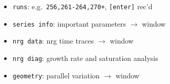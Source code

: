 \documentclass[9pt]{beamer}
\begin{document}
{\begin{frame}[fragile]
\begin{block}{}
\begin{itemize}
\item \verb|runs|: e.g.~\verb|256,261-264,270+|, \verb|[enter]| rec'd
\item \verb|series info|: important parameters $\rightarrow$ window
\item \verb|nrg data|: nrg time traces $\rightarrow$ window
\item \verb|nrg diag|: growth rate and saturation analysis
\item \verb|geometry|: parallel variation $\rightarrow$ window
\end{itemize}
\end{block}

\end{frame}


\begin{frame}[fragile]
  \frametitle{}%

\vspace{-0.2cm}


\end{frame}}
\end{document}
